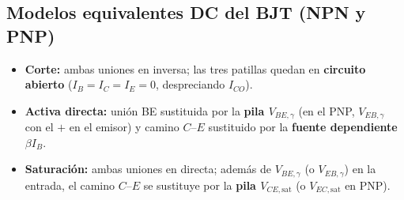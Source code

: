 \documentclass[11pt,a4paper]{article}
\begin{document}
	\subsection{Modelos equivalentes DC del BJT (NPN y PNP)}

	\begin{itemize}
		\item \textbf{Corte:} ambas uniones en inversa; las tres patillas quedan en \textbf{circuito abierto} ($I_B = I_C = I_E = 0$, despreciando $I_{CO}$).
		\item \textbf{Activa directa:} unión BE sustituida por la \textbf{pila $V_{BE,\gamma}$} (en el PNP, $V_{EB,\gamma}$ con el $+$ en el emisor) y camino $C$--$E$ sustituido por la \textbf{fuente dependiente $\beta I_B$}.
		\item \textbf{Saturación:} ambas uniones en directa; además de $V_{BE,\gamma}$ (o $V_{EB,\gamma}$) en la entrada, el camino $C$--$E$ se sustituye por la \textbf{pila $V_{CE,\mathrm{sat}}$} (o $V_{EC,\mathrm{sat}}$ en PNP).
	\end{itemize}
\end{document}

